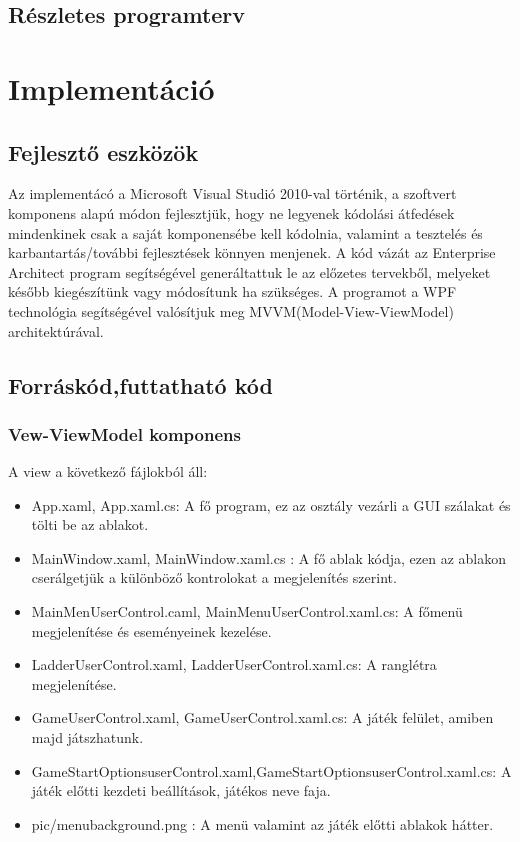 \documentclass[a4paper,12pt]{report}
\begin{document}
\section{Részletes programterv}

\chapter{Implementáció}

\section{Fejlesztő eszközök}

Az implementácó a Microsoft Visual Studió 2010-val történik, a szoftvert komponens alapú módon fejlesztjük,
hogy ne legyenek kódolási átfedések mindenkinek csak a saját komponensébe kell kódolnia, valamint a tesztelés és karbantartás/további fejlesztések könnyen menjenek.
A kód vázát az Enterprise Architect program segítségével generáltattuk le az előzetes tervekből, melyeket később kiegészítünk vagy módosítunk ha szükséges. A programot a WPF technológia segítségével valósítjuk meg MVVM(Model-View-ViewModel) architektúrával.

\section{Forráskód,futtatható kód}

\subsection{Vew-ViewModel komponens}
A view a következő fájlokból áll:
\begin{itemize}
\item App.xaml, App.xaml.cs: A fő program, ez az osztály vezárli a GUI szálakat és tölti be az ablakot.
\item MainWindow.xaml, MainWindow.xaml.cs : A fő ablak kódja, ezen az ablakon cserálgetjük a különböző kontrolokat a megjelenítés  szerint.
\item MainMenUserControl.caml, MainMenuUserControl.xaml.cs: A főmenü megjelenítése és eseményeinek kezelése.
\item LadderUserControl.xaml, LadderUserControl.xaml.cs: A ranglétra megjelenítése.
\item GameUserControl.xaml, GameUserControl.xaml.cs: A játék felület, amiben majd játszhatunk.
\item GameStartOptionsuserControl.xaml,GameStartOptionsuserControl.xaml.cs: A játék előtti kezdeti beállítások, játékos neve faja.
\item pic/menubackground.png : A menü valamint az játék előtti ablakok hátter.
\end{itemize}
\end{document}
